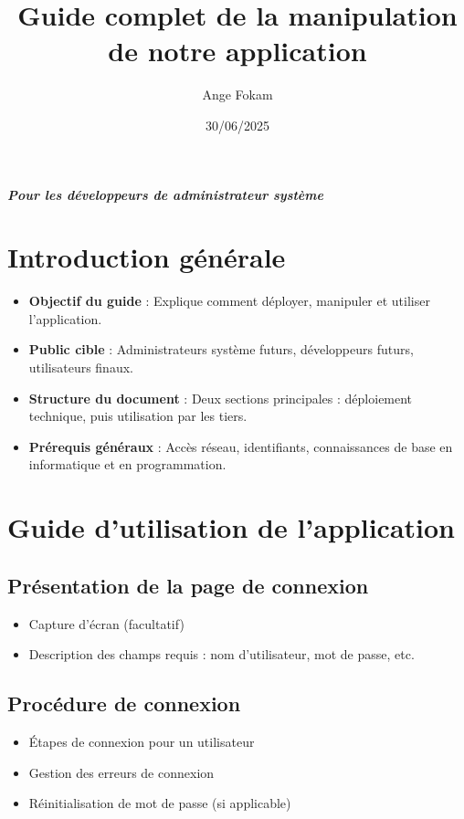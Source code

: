 \documentclass[12pt]{article}
\title{Guide complet de la manipulation de notre application}
\author{Ange Fokam}
\date{30/06/2025}
\begin{document}
\maketitle
\clearpage

\tableofcontents
\clearpage

\textbf{\textit{Pour les développeurs de administrateur système}}
\section*{Introduction générale}

\begin{itemize}[label=--]
    \item \textbf{Objectif du guide} : Explique comment déployer, manipuler et utiliser l'application.
    \item \textbf{Public cible} : Administrateurs système futurs, développeurs futurs, utilisateurs finaux.
    \item \textbf{Structure du document} : Deux sections principales : déploiement technique, puis utilisation par les tiers.
    \item \textbf{Prérequis généraux} : Accès réseau, identifiants, connaissances de base en informatique et en programmation.
\end{itemize}

\section{Guide d’utilisation de l’application}

\subsection{Présentation de la page de connexion}
\begin{itemize}[label=--]
    \item Capture d’écran (facultatif)
    \item Description des champs requis : nom d’utilisateur, mot de passe, etc.
\end{itemize}

\subsection{Procédure de connexion}
\begin{itemize}[label=--]
    \item Étapes de connexion pour un utilisateur
    \item Gestion des erreurs de connexion
    \item Réinitialisation de mot de passe (si applicable)
\end{itemize}
\end{document}
